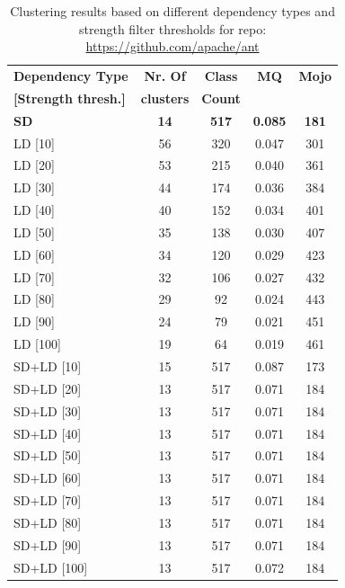\documentclass{ieeeaccess}
\begin{document}
\begin{table}[h]
\caption{Clustering results based on different dependency types and strength filter thresholds for repo: \url{https://github.com/apache/ant}}
\label{tab:clustering_results_ant}
\centering
\setlength{\tabcolsep}{10pt}
\begin{tabular}{|l|c|c|c|c|}
\hline
\textbf{Dependency Type} & \textbf{Nr. Of} & \textbf{Class} & \textbf{MQ} & \textbf{Mojo} \\
\textbf{[Strength thresh.]} & \textbf{clusters} & \textbf{Count} &  &  \\
\hline
\textbf{SD} & \textbf{14} & \textbf{517} & \textbf{0.085} & \textbf{181} \\
LD [10] & 56 & 320 & 0.047 & 301 \\
LD [20] & 53 & 215 & 0.040 & 361 \\
LD [30] & 44 & 174 & 0.036 & 384 \\
LD [40] & 40 & 152 & 0.034 & 401 \\
LD [50] & 35 & 138 & 0.030 & 407 \\
LD [60] & 34 & 120 & 0.029 & 423 \\
LD [70] & 32 & 106 & 0.027 & 432 \\
LD [80] & 29 & 92 & 0.024 & 443 \\
LD [90] & 24 & 79 & 0.021 & 451 \\
LD [100] & 19 & 64 & 0.019 & 461 \\
\hline
SD+LD [10] & 15 & 517 & 0.087 & 173 \\
SD+LD [20] & 13 & 517 & 0.071 & 184 \\
SD+LD [30] & 13 & 517 & 0.071 & 184 \\
SD+LD [40] & 13 & 517 & 0.071 & 184 \\
SD+LD [50] & 13 & 517 & 0.071 & 184 \\
SD+LD [60] & 13 & 517 & 0.071 & 184 \\
SD+LD [70] & 13 & 517 & 0.071 & 184 \\
SD+LD [80] & 13 & 517 & 0.071 & 184 \\
SD+LD [90] & 13 & 517 & 0.071 & 184 \\
SD+LD [100] & 13 & 517 & 0.072 & 184 \\
\hline
\end{tabular}
\end{table}
\end{document}
